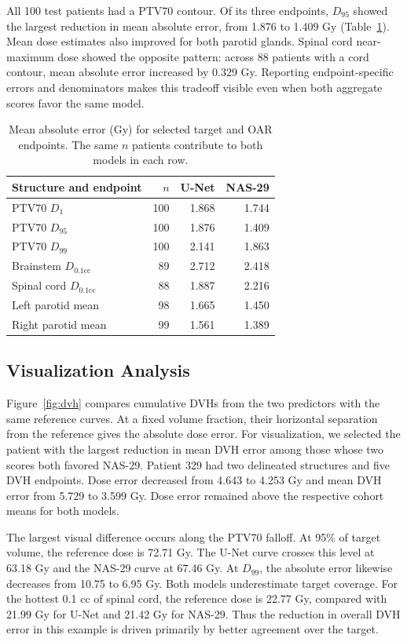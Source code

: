 \documentclass[letterpaper]{article}
\begin{document}
All 100 test patients had a PTV70 contour. Of its three endpoints, $D_{95}$ showed the largest reduction in mean absolute error, from 1.876 to 1.409 Gy (Table~\ref{tab:endpoints}). Mean dose estimates also improved for both parotid glands. Spinal cord near-maximum dose showed the opposite pattern: across 88 patients with a cord contour, mean absolute error increased by 0.329 Gy. Reporting endpoint-specific errors and denominators makes this tradeoff visible even when both aggregate scores favor the same model.

\begin{table}[t]
\centering
\begin{tabular}{lrrr}
\toprule
Structure and endpoint & $n$ & U-Net & NAS-29\\
\midrule
PTV70 $D_1$ & 100 & 1.868 & 1.744\\
PTV70 $D_{95}$ & 100 & 1.876 & 1.409\\
PTV70 $D_{99}$ & 100 & 2.141 & 1.863\\
Brainstem $D_{0.1\mathrm{cc}}$ & 89 & 2.712 & 2.418\\
Spinal cord $D_{0.1\mathrm{cc}}$ & 88 & 1.887 & 2.216\\
Left parotid mean & 98 & 1.665 & 1.450\\
Right parotid mean & 99 & 1.561 & 1.389\\
\bottomrule
\end{tabular}
\caption{Mean absolute error (Gy) for selected target and OAR endpoints. The same $n$ patients contribute to both models in each row.}
\label{tab:endpoints}
\end{table}



\subsection{Visualization Analysis}
Figure~\ref{fig:dvh} compares cumulative DVHs from the two predictors with the same reference curves. At a fixed volume fraction, their horizontal separation from the reference gives the absolute dose error. For visualization, we selected the patient with the largest reduction in mean DVH error among those whose two scores both favored NAS-29. Patient 329 had two delineated structures and five DVH endpoints. Dose error decreased from 4.643 to 4.253 Gy and mean DVH error from 5.729 to 3.599 Gy. Dose error remained above the respective cohort means for both models.

The largest visual difference occurs along the PTV70 falloff. At 95\% of target volume, the reference dose is 72.71 Gy. The U-Net curve crosses this level at 63.18 Gy and the NAS-29 curve at 67.46 Gy. At $D_{99}$, the absolute error likewise decreases from 10.75 to 6.95 Gy. Both models underestimate target coverage. For the hottest 0.1 cc of spinal cord, the reference dose is 22.77 Gy, compared with 21.99 Gy for U-Net and 21.42 Gy for NAS-29. Thus the reduction in overall DVH error in this example is driven primarily by better agreement over the target.
\end{document}
